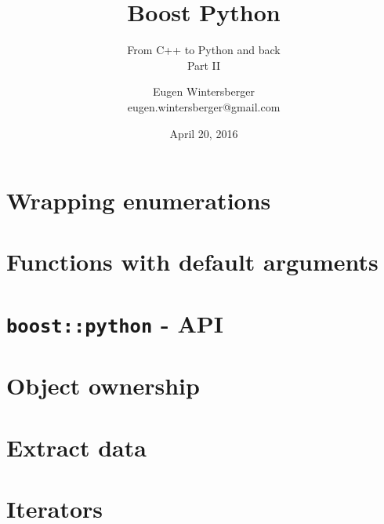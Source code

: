 \documentclass{beamer}
\title{{\Huge Boost Python}}
\subtitle{From C++ to Python and back \\ Part II}
\author{Eugen Wintersberger\\ \small{eugen.wintersberger@gmail.com}}
\date{April 20, 2016}
\begin{document}
\frame{\titlepage}


\part{Wrapping enumerations}
\frame{\partpage}



\part{Functions with default arguments}
\frame{\partpage}


\part{\texttt{boost::python} - API}
\frame{\partpage}


\part{Object ownership}
\frame{\partpage}


\part{Extract data}
\frame{\partpage}


\part{Iterators}
\frame{\partpage}

\end{document}
